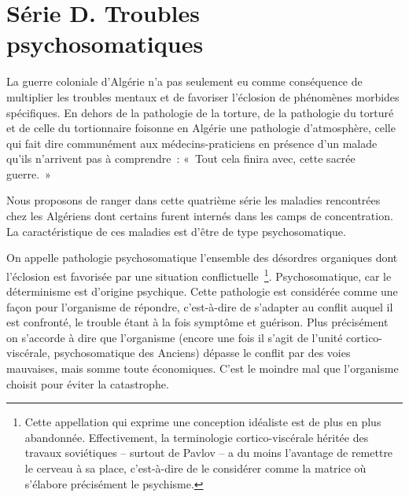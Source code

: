\documentclass[french,twoside]{book} %
\begin{document}
 \section[{Série D. Troubles psychosomatiques}]{Série D. Troubles psychosomatiques}
\noindent La guerre coloniale d’Algérie n’a pas seulement eu comme conséquence de multiplier les troubles mentaux et de favoriser l’éclosion de phénomènes morbides spécifiques. En dehors de la pathologie de la torture, de la pathologie du torturé et de celle du tortionnaire foisonne en Algérie une pathologie d’atmosphère, celle qui fait dire communément aux médecins-praticiens en présence d’un malade qu’ils n’arrivent pas à comprendre : « Tout cela finira avec, cette sacrée guerre. »\par
Nous proposons de ranger dans cette quatrième série les maladies rencontrées chez les Algériens dont certains furent internés dans les camps de concentration. La caractéristique de ces maladies est d’être de type psychosomatique.\par
On appelle pathologie psychosomatique l’ensemble des désordres organiques dont l’éclosion est favorisée par une situation conflictuelle \footnote{Cette appellation qui exprime une conception idéaliste est de plus en plus abandonnée. Effectivement, la terminologie cortico-viscérale héritée des travaux soviétiques – surtout de Pavlov – a du moins l’avantage de remettre le cerveau à sa place, c’est-à-dire de le considérer comme la matrice où s’élabore précisément le psychisme.}. Psychosomatique, car le déterminisme est d’origine psychique. Cette pathologie est considérée comme une façon pour l’organisme de répondre, c’est-à-dire de s’adapter au conflit auquel il est confronté, le trouble étant à la   fois symptôme et guérison. Plus précisément on s’accorde à dire que l’organisme (encore une fois il s’agit de l’unité cortico-viscérale, psychosomatique des Anciens) dépasse le conflit par des voies mauvaises, mais somme toute économiques. C’est le moindre mal que l’organisme choisit pour éviter la catastrophe.\par
\end{document}
